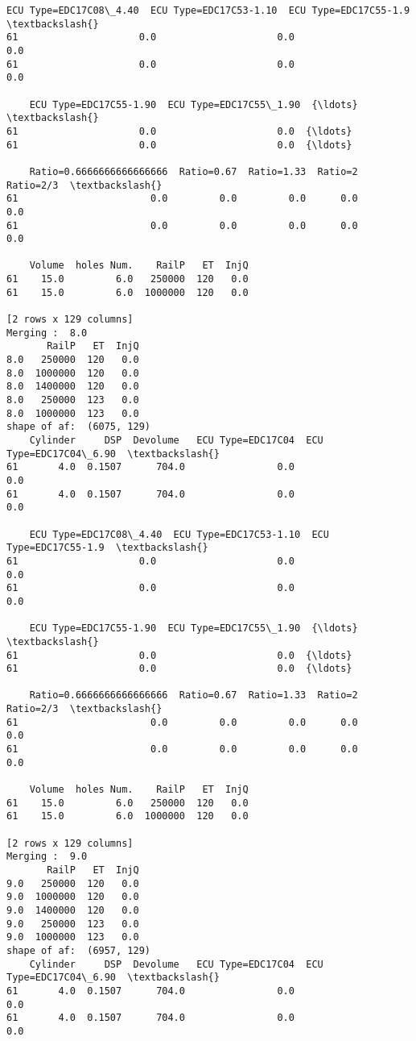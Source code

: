 \documentclass[11pt]{article}
\begin{document}
\begin{Verbatim}[commandchars=\\\{\}]
    ECU Type=EDC17C08\_4.40  ECU Type=EDC17C53-1.10  ECU Type=EDC17C55-1.9  \textbackslash{}
61                     0.0                     0.0                    0.0   
61                     0.0                     0.0                    0.0   

    ECU Type=EDC17C55-1.90  ECU Type=EDC17C55\_1.90  {\ldots}   \textbackslash{}
61                     0.0                     0.0  {\ldots}    
61                     0.0                     0.0  {\ldots}    

    Ratio=0.6666666666666666  Ratio=0.67  Ratio=1.33  Ratio=2  Ratio=2/3  \textbackslash{}
61                       0.0         0.0         0.0      0.0        0.0   
61                       0.0         0.0         0.0      0.0        0.0   

    Volume  holes Num.    RailP   ET  InjQ  
61    15.0         6.0   250000  120   0.0  
61    15.0         6.0  1000000  120   0.0  

[2 rows x 129 columns]
Merging :  8.0
       RailP   ET  InjQ
8.0   250000  120   0.0
8.0  1000000  120   0.0
8.0  1400000  120   0.0
8.0   250000  123   0.0
8.0  1000000  123   0.0
shape of af:  (6075, 129)
    Cylinder     DSP  Devolume   ECU Type=EDC17C04  ECU Type=EDC17C04\_6.90  \textbackslash{}
61       4.0  0.1507      704.0                0.0                     0.0   
61       4.0  0.1507      704.0                0.0                     0.0   

    ECU Type=EDC17C08\_4.40  ECU Type=EDC17C53-1.10  ECU Type=EDC17C55-1.9  \textbackslash{}
61                     0.0                     0.0                    0.0   
61                     0.0                     0.0                    0.0   

    ECU Type=EDC17C55-1.90  ECU Type=EDC17C55\_1.90  {\ldots}   \textbackslash{}
61                     0.0                     0.0  {\ldots}    
61                     0.0                     0.0  {\ldots}    

    Ratio=0.6666666666666666  Ratio=0.67  Ratio=1.33  Ratio=2  Ratio=2/3  \textbackslash{}
61                       0.0         0.0         0.0      0.0        0.0   
61                       0.0         0.0         0.0      0.0        0.0   

    Volume  holes Num.    RailP   ET  InjQ  
61    15.0         6.0   250000  120   0.0  
61    15.0         6.0  1000000  120   0.0  

[2 rows x 129 columns]
Merging :  9.0
       RailP   ET  InjQ
9.0   250000  120   0.0
9.0  1000000  120   0.0
9.0  1400000  120   0.0
9.0   250000  123   0.0
9.0  1000000  123   0.0
shape of af:  (6957, 129)
    Cylinder     DSP  Devolume   ECU Type=EDC17C04  ECU Type=EDC17C04\_6.90  \textbackslash{}
61       4.0  0.1507      704.0                0.0                     0.0   
61       4.0  0.1507      704.0                0.0                     0.0   


\end{Verbatim}
\end{document}
